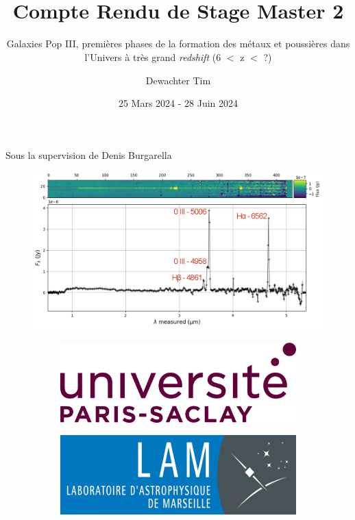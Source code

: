 \documentclass[12pt, a4paper]{article}
\title{\textbf{ \\{\Huge Compte Rendu de Stage Master 2}}}
\subtitle{Galaxies Pop III, premières phases de la formation des métaux et poussières dans l'Univers à très grand \textit{redshift} (6 $<$ z $<$ ?)}
\author{Dewachter Tim}
\date{25 Mars 2024 - 28 Juin 2024}
\begin{document}
\maketitle

\centerline{
Sous la supervision de Denis Burgarella
}

\begin{figure}[H]
  \centering
  \includegraphics[width=\textwidth]{assets/P5_s01518_extracted.png}
\end{figure}

\begin{figure}
  \centering
     \begin{subfigure}[b]{0.3\textwidth}
         \centering
         \includegraphics[width=\textwidth]{assets/paris-saclay.png}
     \end{subfigure}
     \hfill
     \begin{subfigure}[b]{0.3\textwidth}
         \centering
         \includegraphics[width=\textwidth]{assets/lam.png}
     \end{subfigure}
\end{figure}
\end{document}
